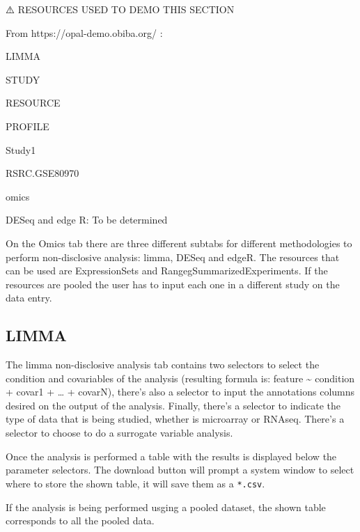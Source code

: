 \documentclass[
]{book}
\begin{document}
⚠️ RESOURCES USED TO DEMO THIS SECTION

From https://opal-demo.obiba.org/ :

LIMMA

STUDY

RESOURCE

PROFILE

Study1

RSRC.GSE80970

omics

DESeq and edge R: To be determined

On the Omics tab there are three different subtabs for different methodologies to perform non-disclosive analysis: limma, DESeq and edgeR. The resources that can be used are ExpressionSets and RangegSummarizedExperiments. If the resources are pooled the user has to input each one in a different study on the data entry.

\hypertarget{limma}{%
\subsection{LIMMA}\label{limma}}

The limma non-disclosive analysis tab contains two selectors to select the condition and covariables of the analysis (resulting formula is: feature \textasciitilde{} condition + covar1 + \ldots{} + covarN), there's also a selector to input the annotations columns desired on the output of the analysis. Finally, there's a selector to indicate the type of data that is being studied, whether is microarray or RNAseq. There's a selector to choose to do a surrogate variable analysis.

Once the analysis is performed a table with the results is displayed below the parameter selectors. The download button will prompt a system window to select where to store the shown table, it will save them as a \texttt{*.csv}.

If the analysis is being performed usging a pooled dataset, the shown table corresponds to all the pooled data.
\end{document}
